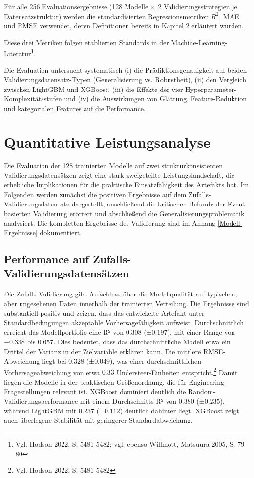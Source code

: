 Für alle 256 Evaluationsergebnisse (128 Modelle × 2 Validierungsstrategien je Datensatzstruktur) werden die standardisierten Regressionsmetriken $R^2$, MAE und RMSE verwendet, deren Definitionen bereits in Kapitel 2 erläutert wurden.

Diese drei Metriken folgen etablierten Standards in der Machine-Learning-Literatur\footnote{Vgl. Hodson 2022, S. 5481-5482; vgl. ebenso Willmott, Matsuura 2005, S. 79-80}.

Die Evaluation untersucht systematisch (i) die Prädiktionsgenauigkeit auf beiden Validierungsdatensatz-Typen (Generalisierung vs. Robustheit), (ii) den Vergleich zwischen LightGBM und XGBoost, (iii) die Effekte der vier Hyperparameter-Komplexitätsstufen und (iv) die Auswirkungen von Glättung, Feature-Reduktion und kategorialen Features auf die Performance.


\section{Quantitative Leistungsanalyse}

Die Evaluation der 128 trainierten Modelle auf zwei strukturkonsistenten Validierungsdatensätzen zeigt eine stark zweigeteilte Leistungslandschaft, die erhebliche Implikationen für die praktische Einsatzfähigkeit des Artefakts hat. Im Folgenden werden zunächst die positiven Ergebnisse auf dem Zufalls-Validierungsdatensatz dargestellt, anschließend die kritischen Befunde der Event-basierten Validierung erörtert und abschließend die Generalisierungsproblematik analysiert.
Die kompletten Ergebnisse der Validierung sind im Anhang \ref{Modell-Ergebnisse} dokumentiert.

\subsection{Performance auf Zufalls-Validierungsdatensätzen}

Die Zufalls-Validierung gibt Aufschluss über die Modellqualität auf typischen, aber ungesehenen Daten innerhalb der trainierten Verteilung. Die Ergebnisse sind substantiell positiv und zeigen, dass das entwickelte Artefakt unter Standardbedingungen akzeptable Vorhersagefähigkeit aufweist.
Durchschnittlich erreicht das Modellportfolio eine R² von $0.308$ (±$0.197$), mit einer Range von $-0.338$ bis $0.657$. Dies bedeutet, dass das durchschnittliche Modell etwa ein Drittel der Varianz in der Zielvariable erklären kann. Die mittlere RMSE-Abweichung liegt bei $0.328$ (±$0.049$), was einer durchschnittlichen Vorhersageabweichung von etwa $0.33$ Understeer-Einheiten entspricht.\footnote{Vgl. Hodson 2022, S. 5481-5482} Damit liegen die Modelle in der praktischen Größenordnung, die für Engineering-Fragestellungen relevant ist. XGBoost dominiert deutlich die Random-Validierungsperformance mit einem Durchschnitts-R² von $0.380$ (±$0.235$), während LightGBM mit $0.237$ (±$0.112$) deutlich dahinter liegt. XGBoost zeigt auch überlegene Stabilität mit geringerer Standardabweichung.

